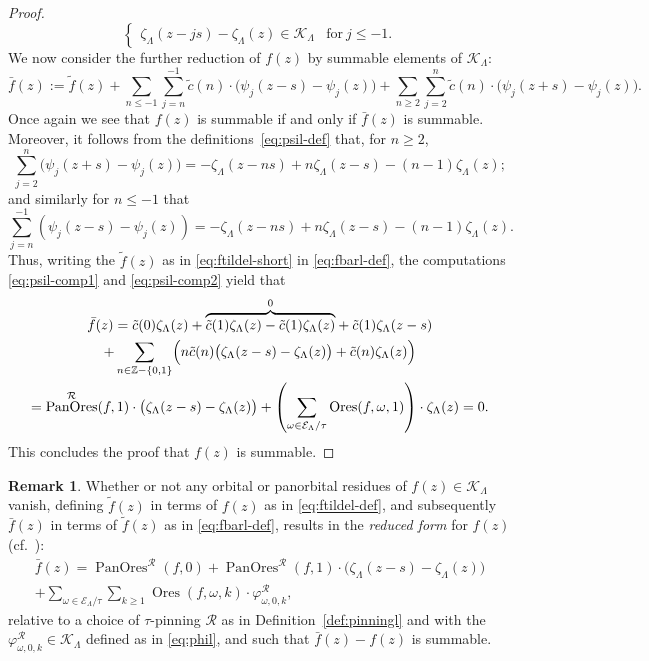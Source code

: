 \documentclass[preprint,12pt]{elsarticle}
\numberwithin{equation}{section} %
\theoremstyle{theorem}
\theoremstyle{definition}
\newtheorem{remark}[theorem]{Remark}
\newcommand{\bk}{\mathcal{K}} %
\newcommand{\bkl}{\bk_{\Lambda}} %
\newcommand{\ec}{\mathcal{E}} %
\newcommand{\ecl}{\ec_{\Lambda}} %
\newcommand{\orbitl}{{\ecl/\tau}} %
\newcommand{\zl}{\zeta_{\Lambda}}
\DeclareMathOperator{\ores}{Ores}
\DeclareMathOperator{\pano}{PanOres}
\begin{document}
\begin{proof}
\begin{equation}
\begin{cases}
            \zl(z-js)-\zl(z)\in\bkl & \text{for} \ j\leq -1.
        \end{cases}
    \end{equation} We now consider the further reduction of $f(z)$ by summable elements of $\bkl$: 
    \begin{equation}
        \bar{f}(z):=\tilde{f}(z)+\sum_{n\leq -1}\sum_{j=n}^{-1}\tilde{c}(n)\cdot\bigl(\psi_j(z-s)-\psi_j(z)\bigr)+\sum_{n\geq 2}\sum_{j=2}^{n}\tilde{c}(n)\cdot\bigl(\psi_j(z+s)-\psi_j(z)\bigr).\label{eq:fbarl-def}
    \end{equation}
    Once again we see that $f(z)$ is summable if and only if $
    \bar{f}(z)$ is summable. Moreover, it follows from the definitions~\eqref{eq:psil-def} that, for $n\geq 2$,
    \begin{equation}\label{eq:psil-comp1}
        \sum_{j=2}^n\bigl(\psi_j(z+s)-\psi_j(z)\bigr)=-\zl(z-ns)+n\zl(z-s)-(n-1)\zl(z);\end{equation} and similarly for $n\leq -1$ that
        \begin{equation}\label{eq:psil-comp2}\sum\limits_{j=n}^{-1}(\psi_j(z-s)-\psi_j(z)) = -\zl(z-ns)+n\zl(z-s)-(n-1)\zl(z).
    \end{equation}
    Thus, writing the $\tilde{f}(z)$ as in \eqref{eq:ftildel-short} in \eqref{eq:fbarl-def}, the computations \eqref{eq:psil-comp1} and \eqref{eq:psil-comp2} yield that \vspace{-.07in}\begin{multline*}
        \bar{f}(z)=\tilde{c}(0)\zl(z)+{\overbrace{\tilde{c}(1)\zl(z)-\tilde{c}(1)\zl(z)}^0}+\tilde{c}(1)\zl(z-s)\\ + \sum_{n\in\mathbb{Z}-\{0,1\}}\Bigl(n\tilde{c}(n)\bigl(\zl(z-s)-\zl(z)\bigr)+\tilde{c}(n)\zl(z)\Bigr)\\
        =\pano^\mathcal{R}(f,1)\cdot\bigl(\zl(z-s)-\zl(z)\bigr)+\left(\sum_{\omega\in\orbitl}\ores(f,\omega,1)\right)\cdot\zl(z)=0.
    \end{multline*}
    This concludes the proof that $f(z)$ is summable.\end{proof}

\begin{remark}\label{rem:reduced-form-l}
    Whether or not any orbital or panorbital residues of $f(z)\in\bkl$ vanish, defining $\tilde{f}(z)$ in terms of $f(z)$ as in \eqref{eq:ftildel-def}, and subsequently $\bar{f}(z)$ in terms of $\tilde{f}(z)$ as in \eqref{eq:fbarl-def}, results in the \emph{reduced form} for $f(z)$ (cf.~\cite[Lem.~B.14]{Dreyfus2018}):
    \begin{multline*}\bar{f}(z)=\pano^\mathcal{R}(f,0)+\pano^\mathcal{R}(f,1)\cdot\bigl(\zl(z-s)-\zl(z)\bigr)\\+\sum_{\omega\in\orbitl}\sum_{k\geq 1}\ores(f,\omega,k)\cdot\varphi^\mathcal{R}_{\omega,0,k},\end{multline*} relative to a choice of $\tau$-pinning $\mathcal{R}$ as in Definition~\ref{def:pinningl} and with the $\varphi^\mathcal{R}_{\omega,0,k}\in\bkl$ defined as in \eqref{eq:phil}, and such that $\bar{f}(z)-f(z)$ is summable.
\end{remark}
\end{document}
